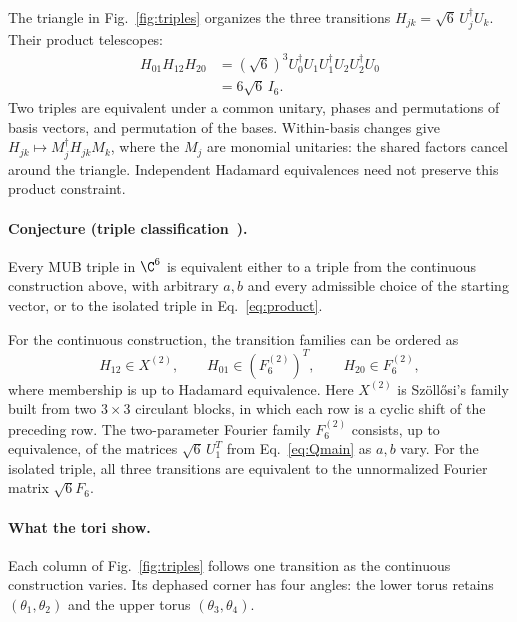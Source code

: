 The triangle in Fig.~\ref{fig:triples} organizes the three transitions $H_{jk}=\sqrt6\,U_j^\dagger U_k$. Their product telescopes:
\begin{equation}
 \begin{aligned}
 H_{01}H_{12}H_{20}
 &=(\sqrt6)^3U_0^\dagger U_1U_1^\dagger U_2U_2^\dagger U_0\\
 &=6\sqrt6\,I_6.
 \end{aligned}
 \label{eq:cycle}
\end{equation}
Two triples are equivalent under a common unitary, phases and permutations of basis vectors, and permutation of the bases. Within-basis changes give $H_{jk}\mapsto M_j^\dagger H_{jk}M_k$, where the $M_j$ are monomial unitaries: the shared factors cancel around the triangle. Independent Hadamard equivalences need not preserve this product constraint.

\label{conj:triples}
\paragraph*{Conjecture \theconjecture{} (triple classification~\cite{MatolcsiEtAl2026MUBTriplets}).}
Every MUB triple in $\C^6$ is equivalent either to a triple from the continuous construction above, with arbitrary $a,b$ and every admissible choice of the starting vector, or to the isolated triple in Eq.~\eqref{eq:product}.

For the continuous construction, the transition families can be ordered as
\[
 H_{12}\in X^{(2)},\qquad
 H_{01}\in(F_6^{(2)})^T,\qquad H_{20}\in F_6^{(2)},
\]
where membership is up to Hadamard equivalence. Here $X^{(2)}$ is Sz\"oll\H{o}si's family built from two $3\times3$ circulant blocks, in which each row is a cyclic shift of the preceding row. The two-parameter Fourier family $F_6^{(2)}$ consists, up to equivalence, of the matrices $\sqrt6\,U_1^T$ from Eq.~\eqref{eq:Qmain} as $a,b$ vary. For the isolated triple, all three transitions are equivalent to the unnormalized Fourier matrix $\sqrt6F_6$.

\paragraph*{What the tori show.}
Each column of Fig.~\ref{fig:triples} follows one transition as the continuous construction varies. Its dephased corner has four angles: the lower torus retains $(\theta_1,\theta_2)$ and the upper torus $(\theta_3,\theta_4)$.

